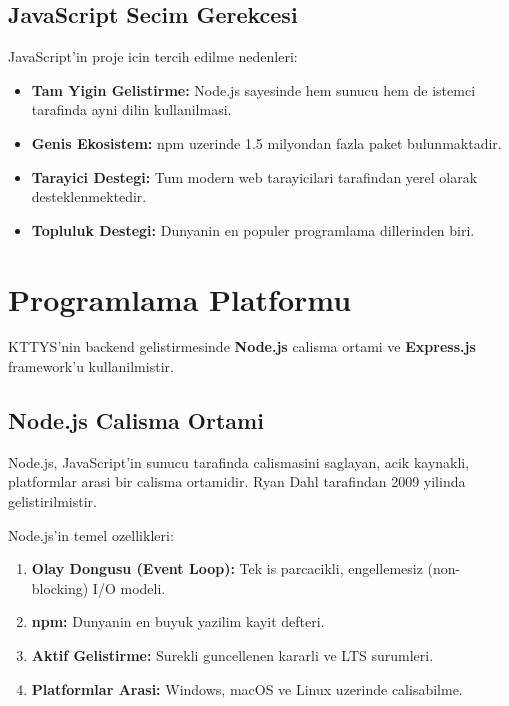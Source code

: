 \subsection{JavaScript Secim Gerekcesi}
\label{subsec:javascript-gerekce}

JavaScript'in proje icin tercih edilme nedenleri:

\begin{itemize}
    \item \textbf{Tam Yigin Gelistirme:} Node.js sayesinde hem 
    sunucu hem de istemci tarafinda ayni dilin kullanilmasi.
    \item \textbf{Genis Ekosistem:} npm uzerinde 1.5 milyondan 
    fazla paket bulunmaktadir.
    \item \textbf{Tarayici Destegi:} Tum modern web tarayicilari 
    tarafindan yerel olarak desteklenmektedir.
    \item \textbf{Topluluk Destegi:} Dunyanin en populer 
    programlama dillerinden biri.
\end{itemize}

\section{Programlama Platformu}
\label{sec:programlama-platformu}

KTTYS'nin backend gelistirmesinde \textbf{Node.js} calisma ortami 
ve \textbf{Express.js} framework'u kullanilmistir.

\subsection{Node.js Calisma Ortami}
\label{subsec:nodejs}

Node.js, JavaScript'in sunucu tarafinda calismasini saglayan, 
acik kaynakli, platformlar arasi bir calisma ortamidir. Ryan Dahl 
tarafindan 2009 yilinda gelistirilmistir.

Node.js'in temel ozellikleri:

\begin{enumerate}
    \item \textbf{Olay Dongusu (Event Loop):} Tek is parcacikli, 
    engellemesiz (non-blocking) I/O modeli.
    \item \textbf{npm:} Dunyanin en buyuk yazilim kayit defteri.
    \item \textbf{Aktif Gelistirme:} Surekli guncellenen kararli 
    ve LTS surumleri.
    \item \textbf{Platformlar Arasi:} Windows, macOS ve Linux 
    uzerinde calisabilme.
\end{enumerate}

